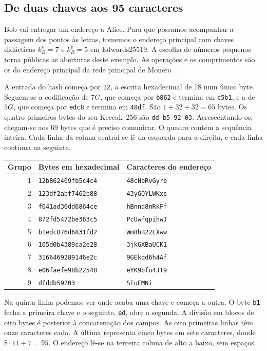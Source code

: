 \subsection*{De duas chaves aos 95 caracteres}

Bob vai entregar um endereço a Alice. Para que possamos acompanhar
a passagem dos pontos às letras, tomemos o endereço principal com
chaves didácticas \(k_B^s=7\) e \(k_B^v=5\) em Edwards25519.
A escolha de números pequenos torna públicas as aberturas deste
exemplo. As operações e os comprimentos são os do endereço principal
da rede principal de Monero~\cite{monero-source-v16}.

A entrada do hash começa por \texttt{12}, a escrita hexadecimal
de 18 num único byte. Seguem-se a codificação de \(7G\), que começa
por \texttt{b862} e termina em \texttt{c5b1}, e a de \(5G\), que
começa por \texttt{edc8} e termina em \texttt{48df}. São
\(1+32+32=65\) bytes. Os quatro primeiros bytes do seu Keccak--256
são \texttt{dd b5 92 03}. Acrescentando-os, chegam-se aos 69 bytes
que é preciso comunicar. O quadro contém a sequência inteira. Cada
linha da coluna central se lê da esquerda para a direita, e cada
linha continua na seguinte.
\begin{center}
\begin{tabular}{rll}
\hline
Grupo & Bytes em hexadecimal & Caracteres do endereço\\
\hline
1 & \texttt{12b862409fb5c4c4} & \texttt{48cNbRvGyrb}\\
2 & \texttt{123df2abf7462b88} & \texttt{43yGQYLWKxs}\\
3 & \texttt{f041ad36dd6864ce} & \texttt{hBnnq8nRkFf}\\
4 & \texttt{872fd5472be363c5} & \texttt{PcUwfqpihwJ}\\
5 & \texttt{b1edc876d6831fd2} & \texttt{Wm8hB22LXww}\\
6 & \texttt{105d0b4389ca2e28} & \texttt{3jkGXBaUCK1}\\
7 & \texttt{3166469289146e2c} & \texttt{9GEkqd6h4Af}\\
8 & \texttt{e06faefe98b22548} & \texttt{eYK9bfu4JT9}\\
9 & \texttt{dfddb59203}       & \texttt{SFuEMNi}\\
\hline
\end{tabular}
\end{center}
Na quinta linha podemos ver onde acaba uma chave e começa a outra.
O byte \texttt{b1} fecha a primeira chave e o seguinte,
\texttt{ed}, abre a segunda. A divisão em blocos de oito bytes é
posterior à concatenação dos campos. As oito primeiras linhas têm
onze caracteres cada. A última representa cinco bytes em sete
caracteres, donde \(8\cdot11+7=95\). O endereço lê-se na terceira
coluna de alto a baixo, sem espaços.


